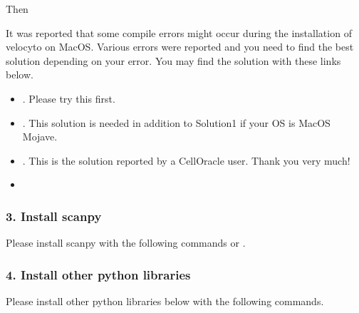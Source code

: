 \documentclass[letterpaper,10pt,english]{sphinxmanual}
\begin{document}
Then

\begin{sphinxVerbatim}[commandchars=\\\{\}]
  
\end{sphinxVerbatim}

It was reported that some compile errors might occur during the installation of velocyto on MacOS.
Various errors were reported and you need to find the best solution depending on your error.
You may find the solution with these links below.
\begin{itemize}
\item {} 
. Please try this first.

\item {} 
. This solution is needed in addition to Solution\sphinxhyphen{}1 if your OS is MacOS Mojave.

\item {} 
. This is the solution reported by a CellOracle user. Thank you very much!

\item {} 

\end{itemize}


\subsubsection{3. Install scanpy}
\label{\detokenize{installation/index:install-scanpy}}
Please install scanpy with the following commands or  .

\begin{sphinxVerbatim}[commandchars=\\\{\}]
  
\end{sphinxVerbatim}


\subsubsection{4. Install other python libraries}
\label{\detokenize{installation/index:install-other-python-libraries}}
Please install other python libraries below with the following commands.
\end{document}
